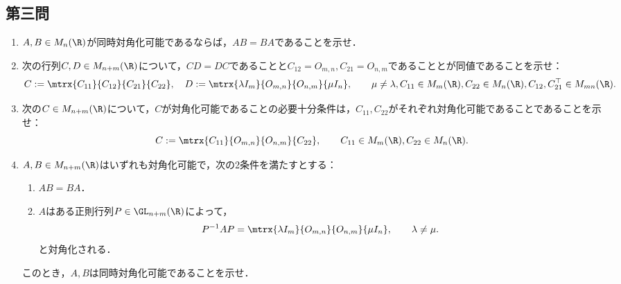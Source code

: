 \documentclass[uplatex,dvipdfmx]{jsarticle}
\begin{document}
\subsection{第三問}

\begin{tcolorbox}[colframe=ForestGreen, colback=ForestGreen!10!white,breakable,colbacktitle=ForestGreen!40!white,coltitle=black,fonttitle=\bfseries\sffamily,
    title=第３問]
    \begin{problem}\mbox{}\label{prob-23-1-3}
        \begin{enumerate}[{問}1]
            \item $A,B\in M_n(\R)$が同時対角化可能であるならば，$AB=BA$であることを示せ．
            \item 次の行列$C,D\in M_{n+m}(\R)$について，$CD=DC$であることと$C_{12}=O_{m,n},C_{21}=O_{n,m}$であることとが同値であることを示せ：
            \[C:=\mtrx{C_{11}}{C_{12}}{C_{21}}{C_{22}},\quad D:=\mtrx{\lambda I_m}{O_{m,n}}{O_{n,m}}{\mu I_n},\qquad\mu\ne\lambda,C_{11}\in M_m(\R),C_{22}\in M_n(\R),C_{12},C_{21}^\top\in M_{mn}(\R).\]
            \item 次の$C\in M_{n+m}(\R)$について，$C$が対角化可能であることの必要十分条件は，$C_{11},C_{22}$がそれぞれ対角化可能であることであることを示せ：
            \[C:=\mtrx{C_{11}}{O_{m,n}}{O_{n,m}}{C_{22}},\qquad C_{11}\in M_m(\R),C_{22}\in M_n(\R).\]
            \item $A,B\in M_{n+m}(\R)$はいずれも対角化可能で，次の2条件を満たすとする：
            \begin{enumerate}
                \item $AB=BA$．
                \item $A$はある正則行列$P\in\GL_{n+m}(\R)$によって，
                \[P^{-1}AP=\mtrx{\lambda I_m}{O_{m,n}}{O_{n,m}}{\mu I_n},\qquad \lambda\ne\mu.\]
                と対角化される．
            \end{enumerate}
            このとき，$A,B$は同時対角化可能であることを示せ．
        \end{enumerate}
    \end{problem}
\end{tcolorbox}
\end{document}
